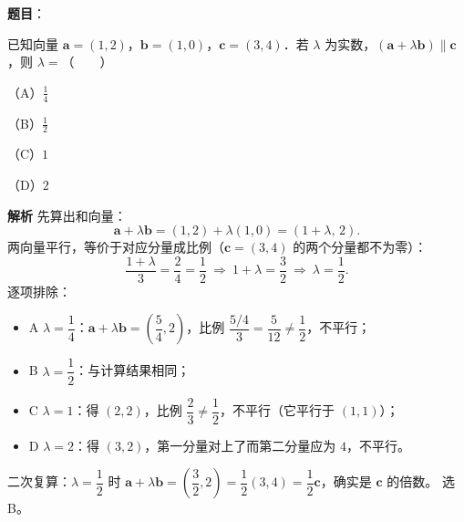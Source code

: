\begin{answer}

\textbf{题目}：

已知向量 $\boldsymbol a=(1,2)$，$\boldsymbol b=(1,0)$，$\boldsymbol c=(3,4)$．若 $\lambda$ 为实数，$(\boldsymbol a+\lambda\boldsymbol b)\parallel\boldsymbol c$，则 $\lambda=$\mbox{（　　）}

（A）$\frac14$

（B）$\frac12$

（C）$1$

（D）$2$

\textbf{解析}
先算出和向量：
\nopagebreak[4]
\[
\boldsymbol a+\lambda\boldsymbol b=(1,2)+\lambda(1,0)=(1+\lambda,\,2).
\]
两向量平行，等价于对应分量成比例（$\boldsymbol c=(3,4)$ 的两个分量都不为零）：
\nopagebreak[4]
\[
\frac{1+\lambda}{3}=\frac{2}{4}=\frac12\ \Longrightarrow\ 1+\lambda=\frac32\ \Longrightarrow\ \lambda=\frac12.
\]
逐项排除：
\begin{itemize}
\item A $\lambda=\dfrac14$：$\boldsymbol a+\lambda\boldsymbol b=\left(\dfrac54,2\right)$，比例 $\dfrac{5/4}{3}=\dfrac{5}{12}\neq\dfrac12$，不平行；
\item B $\lambda=\dfrac12$：与计算结果相同；
\item C $\lambda=1$：得 $(2,2)$，比例 $\dfrac23\neq\dfrac12$，不平行（它平行于 $(1,1)$）；
\item D $\lambda=2$：得 $(3,2)$，第一分量对上了而第二分量应为 $4$，不平行。
\end{itemize}
二次复算：$\lambda=\dfrac12$ 时 $\boldsymbol a+\lambda\boldsymbol b=\left(\dfrac32,2\right)=\dfrac12(3,4)=\dfrac12\boldsymbol c$，确实是 $\boldsymbol c$ 的倍数。
选 B。


\end{answer}
